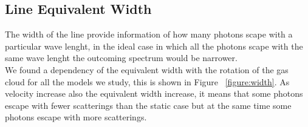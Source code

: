 \documentclass[usenatbib]{mn2e}
\begin{document}
\subsection{Line Equivalent Width}
\label{sec:LW}

The width of the line provide information of
how many photons scape with a particular wave lenght, in the
ideal case in which all the photons scape with the same wave lenght
the outcoming spectrum would be narrower. \\
We found a dependency of the equivalent width with the rotation of the gas cloud for all the models we study, this is shown in Figure ~\ref{figure:width}. As velocity increase also the equivalent width increase, it means that some photons escape with fewer scatterings than the static case but at the same time some photons escape with more scatterings.\\

 
\end{document}
